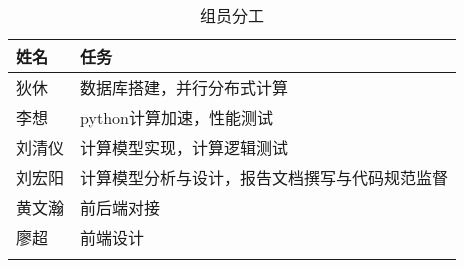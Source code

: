   \begin{longtable}{lX}

\hline 姓名 & 任务  \\ \hline

 狄休 & 数据库搭建，并行分布式计算 \\ \hline
 李想 & python计算加速，性能测试  \\ \hline
 刘清仪 & 计算模型实现，计算逻辑测试  \\ \hline
 刘宏阳 & 计算模型分析与设计，报告文档撰写与代码规范监督  \\ \hline
 黄文瀚 & 前后端对接  \\ \hline
 廖超 & 前端设计  \\ \hline


      \caption{组员分工}
  \label{tab:sys.param}
  \end{longtable}
